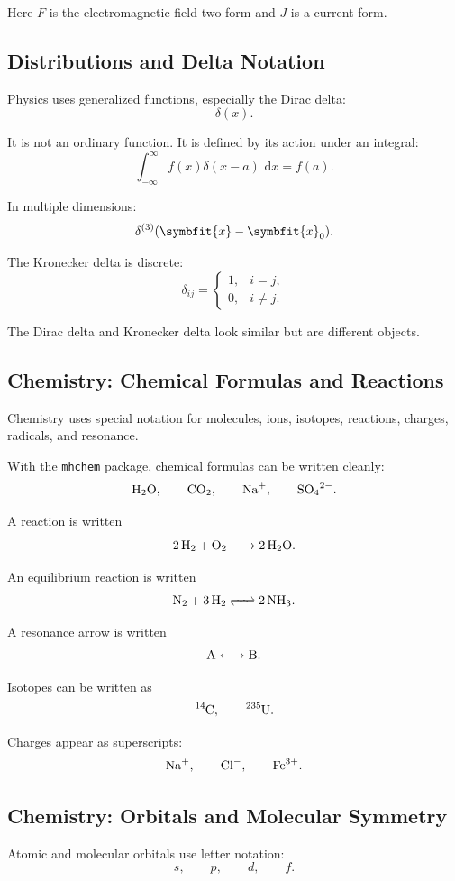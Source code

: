 \documentclass[11pt,twocolumn]{article}
\newcommand{\vct}[1]{\symbfit{#1}}   %
\newcommand{\dd}{\,\mathrm{d}}
\begin{document}
Here \(F\) is the electromagnetic field two-form and \(J\) is a current form.

\subsection{Distributions and Delta Notation}

Physics uses generalized functions, especially the Dirac delta:
\[
\delta(x).
\]

It is not an ordinary function. It is defined by its action under an integral:
\[
\int_{-\infty}^{\infty}
f(x)\delta(x-a)\,\dd x
=
f(a).
\]

In multiple dimensions:
\[
\delta^{(3)}(\vct{x}-\vct{x}_0).
\]

The Kronecker delta is discrete:
\[
\delta_{ij}
=
\begin{cases}
1, & i=j,\\
0, & i\ne j.
\end{cases}
\]

The Dirac delta and Kronecker delta look similar but are different objects.

\subsection{Chemistry: Chemical Formulas and Reactions}

Chemistry uses special notation for molecules, ions, isotopes, reactions,
charges, radicals, and resonance.

With the \texttt{mhchem} package, chemical formulas can be written cleanly:
\[
\ce{H2O},
\qquad
\ce{CO2},
\qquad
\ce{Na+},
\qquad
\ce{SO4^2-}.
\]

A reaction is written
\[
\ce{2H2 + O2 -> 2H2O}.
\]

An equilibrium reaction is written
\[
\ce{N2 + 3H2 <=> 2NH3}.
\]

A resonance arrow is written
\[
\ce{A <-> B}.
\]

Isotopes can be written as
\[
\ce{^{14}C},
\qquad
\ce{^{235}U}.
\]

Charges appear as superscripts:
\[
\ce{Na+},
\qquad
\ce{Cl-},
\qquad
\ce{Fe^3+}.
\]

\subsection{Chemistry: Orbitals and Molecular Symmetry}

Atomic and molecular orbitals use letter notation:
\[
s,
\qquad
p,
\qquad
d,
\qquad
f.
\]
\end{document}
